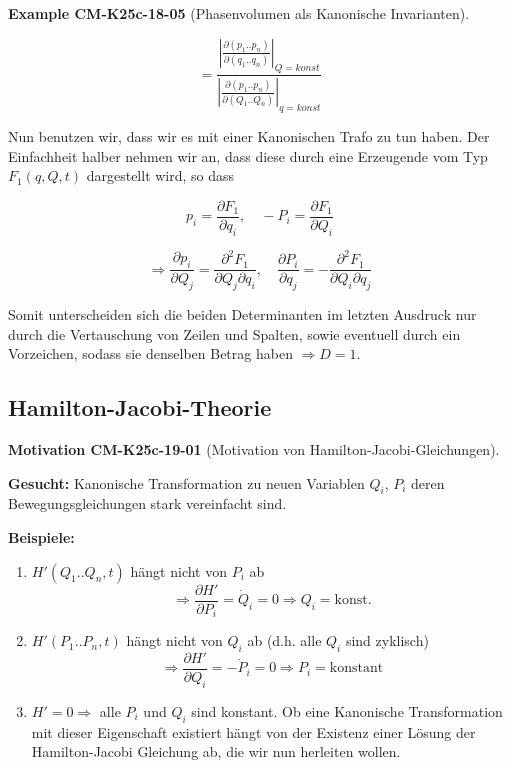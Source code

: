 \documentclass[10pt, letterpaper]{article}
\newcommand{\CustomHeading}[3]{%
  \par\medskip\noindent%
  \textbf{#1 #2} \textnormal{(#3)}.\enskip%
}
\newenvironment{EXA}[2]{\CustomHeading{Example}{#1}{#2}}{}
\newenvironment{MOT}[2]{\CustomHeading{Motivation}{#1}{#2}}{}
\begin{document}
\begin{EXA}{CM-K25c-18-05}{Phasenvolumen als Kanonische Invarianten}
\[
= \frac{\left|\frac{\partial(p_1..p_n)}{\partial(q_1..q_n)}\right|_{Q=konst}}{\left|\frac{\partial(p_1..p_n)}{\partial(Q_1..Q_n)}\right|_{q=konst}}
\]

Nun benutzen wir, dass wir es mit einer Kanonischen Trafo zu tun haben. Der Einfachheit halber nehmen wir an, dass diese durch eine Erzeugende vom Typ $F_1(q,Q,t)$ dargestellt wird, so dass

\[
p_i = \frac{\partial F_1}{\partial q_i}, \quad -P_i = \frac{\partial F_1}{\partial Q_i}
\]

\[
\Rightarrow \frac{\partial p_i}{\partial Q_j} = \frac{\partial^2 F_1}{\partial Q_j \partial q_i}, \quad \frac{\partial P_i}{\partial q_j} = -\frac{\partial^2 F_1}{\partial Q_i \partial q_j}
\]

Somit unterscheiden sich die beiden Determinanten im letzten Ausdruck nur durch die Vertauschung von Zeilen und Spalten, sowie eventuell durch ein Vorzeichen, sodass sie denselben Betrag haben $\Rightarrow D = 1$.
\end{EXA}

\subsection{Hamilton-Jacobi-Theorie}

\begin{MOT}{CM-K25c-19-01}{Motivation von Hamilton-Jacobi-Gleichungen}
\textbf{Gesucht:} Kanonische Transformation zu neuen Variablen $Q_i$, $P_i$ deren Bewegungsgleichungen stark vereinfacht sind.

\textbf{Beispiele:} 
\begin{enumerate}
\item $H'(Q_1..Q_n,t)$ hängt nicht von $P_i$ ab
\[\Rightarrow \frac{\partial H'}{\partial P_i} = \dot{Q}_i = 0 \Rightarrow Q_i = \text{konst.}\]

\item $H'(P_1..P_n,t)$ hängt nicht von $Q_i$ ab (d.h. alle $Q_i$ sind zyklisch)
\[\Rightarrow \frac{\partial H'}{\partial Q_i} = -\dot{P}_i = 0 \Rightarrow P_i = \text{konstant}\]

\item $H' = 0 \Rightarrow$ alle $P_i$ und $Q_i$ sind konstant. Ob eine Kanonische Transformation mit dieser Eigenschaft existiert hängt von der Existenz einer Lösung der Hamilton-Jacobi Gleichung ab, die wir nun herleiten wollen.
\end{enumerate}
\end{MOT}
\end{document}
